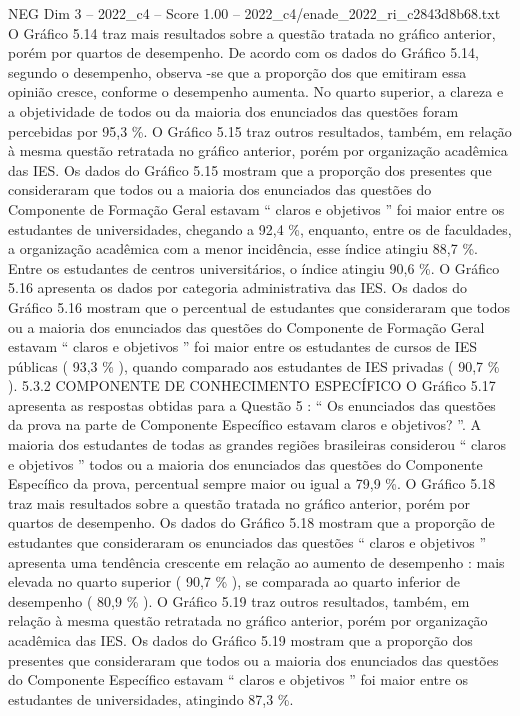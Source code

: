 \begin{textsample}{NEG Dim 3 – 2022\_c4 – Score 1.00 – 2022\_c4/enade\_2022\_ri\_c2843d8b68.txt}
O Gráfico 5.14 traz mais resultados sobre a questão tratada no gráfico anterior, porém por quartos de desempenho.
De acordo com os dados do Gráfico 5.14, segundo o desempenho, observa -se que a proporção dos que emitiram essa opinião cresce, conforme o desempenho aumenta.
No quarto superior, a clareza e a objetividade de todos ou da maioria dos enunciados das questões foram percebidas por 95,3 \%.
O Gráfico 5.15 traz outros resultados, também, em relação à mesma questão retratada no gráfico anterior, porém por organização acadêmica das IES.
Os dados do Gráfico 5.15 mostram que a proporção dos presentes que consideraram que todos ou a maioria dos enunciados das questões do Componente de Formação Geral estavam “ claros e objetivos ” foi maior entre os estudantes de universidades, chegando a 92,4 \%, enquanto, entre os de faculdades, a organização acadêmica com a menor incidência, esse índice atingiu 88,7 \%.
Entre os estudantes de centros universitários, o índice atingiu 90,6 \%.
O Gráfico 5.16 apresenta os dados por categoria administrativa das IES.
Os dados do Gráfico 5.16 mostram que o percentual de estudantes que consideraram que todos ou a maioria dos enunciados das questões do Componente de Formação Geral estavam “ claros e objetivos ” foi maior entre os estudantes de cursos de IES públicas ( 93,3 \% ), quando comparado aos estudantes de IES privadas ( 90,7 \% ). 5.3.2 COMPONENTE DE CONHECIMENTO ESPECÍFICO O Gráfico 5.17 apresenta as respostas obtidas para a Questão 5 : “ Os enunciados das questões da prova na parte de Componente Específico estavam claros e objetivos? ”.
A maioria dos estudantes de todas as grandes regiões brasileiras considerou “ claros e objetivos ” todos ou a maioria dos enunciados das questões do Componente Específico da prova, percentual sempre maior ou igual a 79,9 \%.
O Gráfico 5.18 traz mais resultados sobre a questão tratada no gráfico anterior, porém por quartos de desempenho.
Os dados do Gráfico 5.18 mostram que a proporção de estudantes que consideraram os enunciados das questões “ claros e objetivos ” apresenta uma tendência crescente em relação ao aumento de desempenho : mais elevada no quarto superior ( 90,7 \% ), se comparada ao quarto inferior de desempenho ( 80,9 \% ).
O Gráfico 5.19 traz outros resultados, também, em relação à mesma questão retratada no gráfico anterior, porém por organização acadêmica das IES.
Os dados do Gráfico 5.19 mostram que a proporção dos presentes que consideraram que todos ou a maioria dos enunciados das questões do Componente Específico estavam “ claros e objetivos ” foi maior entre os estudantes de universidades, atingindo 87,3 \%.

\end{textsample}
